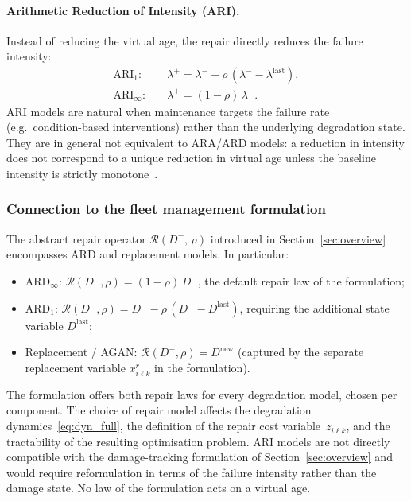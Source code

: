 \documentclass[11pt,a4paper]{article}
\theoremstyle{plain}
\theoremstyle{definition}
\theoremstyle{remark}
\begin{document}
\paragraph{Arithmetic Reduction of Intensity (ARI).}
Instead of reducing the virtual age, the repair directly reduces the failure intensity:
\begin{align}
  \text{ARI}_1: &\quad \lambda^+ = \lambda^- - \rho\,(\lambda^- - \lambda^{\mathrm{last}}), \label{eq:ari1} \\
  \text{ARI}_\infty: &\quad \lambda^+ = (1-\rho)\,\lambda^-. \label{eq:ariinf}
\end{align}
ARI models are natural when maintenance targets the failure rate (e.g.\ condition-based interventions) rather than the underlying degradation state.
They are in general not equivalent to ARA/ARD models: a reduction in intensity does not correspond to a unique reduction in virtual age unless the baseline intensity is strictly monotone~\cite{DoyenGaudoin2004}.

\subsubsection{Connection to the fleet management formulation}
\label{sec:repair_connection}

The abstract repair operator $\mathcal{R}(D^-,\,\rho)$ introduced in Section~\ref{sec:overview} encompasses ARD and replacement models.
In particular:
\begin{itemize}
  \item $\text{ARD}_\infty$: $\mathcal{R}(D^-,\rho) = (1-\rho)\,D^-$, the default repair law of the formulation;
  \item $\text{ARD}_1$: $\mathcal{R}(D^-,\rho) = D^- - \rho\,(D^- - D^{\mathrm{last}})$, requiring the additional state variable $D^{\mathrm{last}}$;
  \item Replacement / AGAN: $\mathcal{R}(D^-,\rho) = D^{\mathrm{new}}$ (captured by the separate replacement variable $x^r_{i\ell k}$ in the formulation).
\end{itemize}
The formulation offers both repair laws for every degradation model, chosen per component.
The choice of repair model affects the degradation dynamics~\eqref{eq:dyn_full}, the definition of the repair cost variable~$z_{i\ell k}$, and the tractability of the resulting optimisation problem.
ARI models are not directly compatible with the damage-tracking formulation of Section~\ref{sec:overview} and would require reformulation in terms of the failure intensity rather than the damage state.
No law of the formulation acts on a virtual age.
\end{document}
